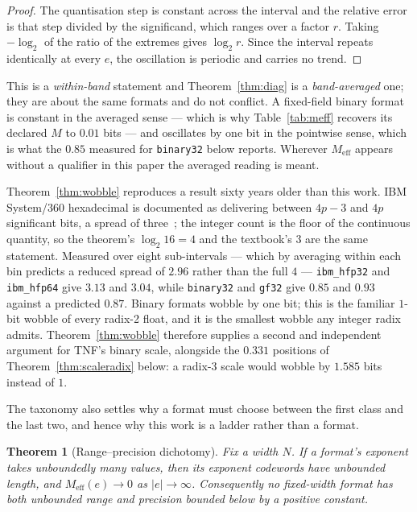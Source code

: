 \documentclass[11pt]{article}
\newtheorem{theorem}{Theorem}
\theoremstyle{definition}
\begin{document}
\begin{proof}
The quantisation step is constant across the interval and the relative error is
that step divided by the significand, which ranges over a factor $r$. Taking
$-\log_2$ of the ratio of the extremes gives $\log_2 r$. Since the interval
repeats identically at every $e$, the oscillation is periodic and carries no
trend.
\end{proof}

This is a \emph{within-band} statement and Theorem~\ref{thm:diag} is a
\emph{band-averaged} one; they are about the same formats and do not conflict.
A fixed-field binary format is constant in the averaged sense --- which is why
Table~\ref{tab:meff} recovers its declared $M$ to $0.01$ bits --- and oscillates by
one bit in the pointwise sense, which is what the $0.85$ measured for
\texttt{binary32} below reports. Wherever $M_{\mathrm{eff}}$ appears without a
qualifier in this paper the averaged reading is meant.

Theorem~\ref{thm:wobble} reproduces a result sixty years older than this work.
IBM System/360 hexadecimal is documented as delivering between $4p-3$ and $4p$
significant bits, a spread of three~\cite{goldberg1991,ibmhfp}; the integer count
is the floor of the continuous quantity, so the theorem's $\log_2 16 = 4$ and the
textbook's $3$ are the same statement. Measured over eight sub-intervals ---
which by averaging within each bin predicts a reduced spread of $2.96$ rather than
the full $4$ --- \texttt{ibm\_hfp32} and \texttt{ibm\_hfp64} give $3.13$ and
$3.04$, while \texttt{binary32} and \texttt{gf32} give $0.85$ and $0.93$ against a
predicted $0.87$. Binary formats wobble by one bit; this is the familiar
$1$-bit wobble of every radix-2 float, and it is the smallest wobble any integer
radix admits. Theorem~\ref{thm:wobble} therefore supplies a second and independent
argument for TNF's binary scale, alongside the $0.331$ positions of
Theorem~\ref{thm:scaleradix} below: a radix-3 scale would wobble by $1.585$ bits
instead of $1$.

The taxonomy also settles why a format must choose between the first class and the
last two, and hence why this work is a ladder rather than a format.

\begin{theorem}[Range--precision dichotomy]
\label{thm:dichotomy}
Fix a width $N$. If a format's exponent takes unboundedly many values, then its
exponent codewords have unbounded length, and
$M_{\mathrm{eff}}(e)\to0$ as $|e|\to\infty$. Consequently no fixed-width format
has both unbounded range and precision bounded below by a positive constant.
\end{theorem}
\end{document}
